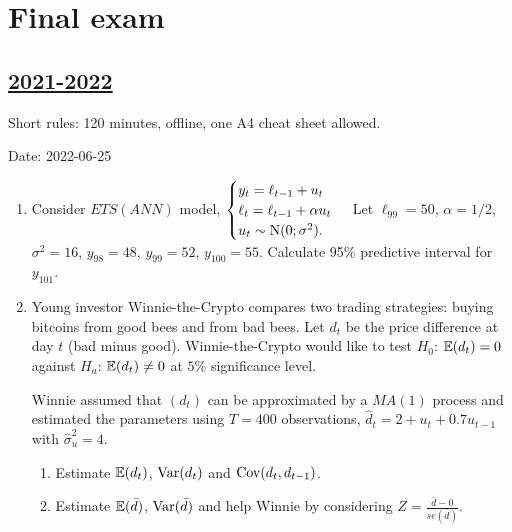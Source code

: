 
\newpage
\thispagestyle{empty}
\section{Final exam}
 


\subsection[2021-2022]{\hyperref[sec:sol_kr_04_2021_2022]{2021-2022}}
\label{sec:kr_04_2021_2022} %

Short rules: 120 minutes, offline, one A4 cheat sheet allowed.

Date: 2022-06-25

\begin{enumerate}

\item Consider $ETS(ANN)$ model,
	$
	\begin{cases}
	y_t = \ell_{t-1} + u_t \\
	\ell_t = \ell_{t-1} + \alpha u_t \\
	u_t \sim \mathrm{N}(0;\sigma^2). \\
	\end{cases}
	$
Let $\ell_{99} = 50$, $\alpha = 1/2$, $\sigma^2 = 16$, $y_{98} = 48$, $y_{99} = 52$, $y_{100} = 55$. Calculate 95\% predictive interval for $y_{101}$.

\item Young investor Winnie-the-Crypto compares two trading strategies: buying bitcoins from good bees and from bad bees. 
Let $d_t$ be the price difference at day $t$ (bad minus good). 
Winnie-the-Crypto would like to test $H_0$: $\operatorname{\mathbb{E}}(d_t) = 0$ against $H_a$: $\operatorname{\mathbb{E}}(d_t) \neq 0$ at $5\%$ significance level.

Winnie assumed that $(d_t)$ can be approximated by a $MA(1)$ process and estimated the parameters using $T=400$ observations, $\hat d_t = 2 + u_t + 0.7 u_{t-1}$ 
with $\hat\sigma^2_u = 4$.

\begin{enumerate}
	\item Estimate $\operatorname{\mathbb{E}}(d_t)$, $\operatorname{Var}(d_t)$ and $\operatorname{Cov}(d_t, d_{t-1})$.
	\item Estimate $\operatorname{\mathbb{E}}(\bar d)$, $\operatorname{Var}(\bar d)$ and help Winnie by considering $Z = \frac{\bar d - 0}{se(\bar d)}$.
\end{enumerate}




\end{enumerate}
